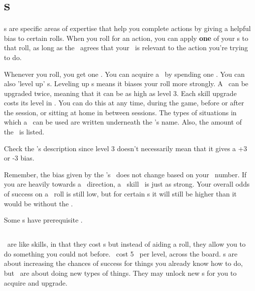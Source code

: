 
\section{\skillC s}
\hypertarget{skills}{}

\par
\skillC s are specific areas of expertise that help you complete actions by giving a helpful bias to certain rolls. When you roll for an action, you can apply \textbf{one} of your \skill s to that roll, as long as the \gm\, agrees that your \skill\, is relevant to the action you're trying to do.

\par
Whenever you roll, you get one \xp . You can acquire a \skill\, by spending one \xp . You can also 'level up' \skill s. Leveling up \skill s means it biases your roll more strongly. A \skill\, can be upgraded twice, meaning that it can be as high as level 3. Each skill upgrade costs its level in \xp . You can do this at any time, during the game, before or after the session, or sitting at home in between sessions. The types of situations in which a \skill\, can be used are written underneath the \skill 's name. Also, the amount of the \modifier\, is listed.

\par
Check the \skill 's description since level 3 doesn't necessarily mean that it gives a +3 or -3 bias.

\par
Remember, the bias given by the \skill 's \modifier\, does not change based on your \both\, number. If you are heavily towards a \feelings\, direction, a \lasers\, skill \modifier\, is just as strong. Your overall odds of success on a \lasers\, roll is still low, but for certain \skill s it will still be higher than it would be without the \skill .

\par
Some \skill s have prerequisite \abilityP .

\subsection{\abilityPC}
\abilityPC\, are like skills, in that they cost \xp s but instead of aiding a roll, they allow you to do something you could not before. \abilityPC\, cost 5 \xp\, per level, across the board. \skillC s are about increasing the chances of success for things you already know how to do, but \abilityP\, are about doing new types of things. They may unlock new \skill s for you to acquire and upgrade.